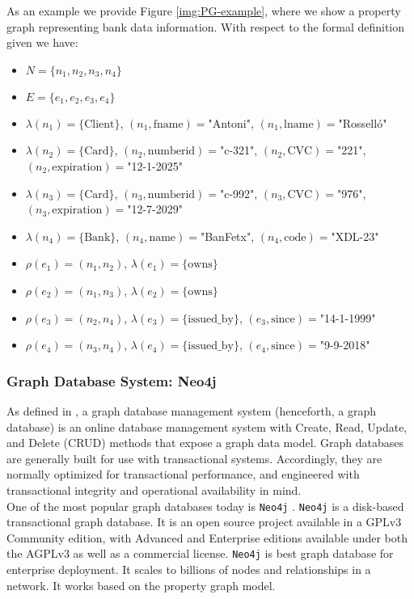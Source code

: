 As an example we provide Figure \ref{img:PG-example}, where we show a property graph representing bank data information. With respect to the formal definition given we have:
\begin{itemize}
    \item $N = \{n_1, n_2, n_3, n_4\}$
    \item $E = \{e_1, e_2, e_3, e_4\}$
    \item $\lambda(n_1)=\{\text{Client}\}$, $(n_1, \text{fname})=$"Antoni", $(n_1, \text{lname})=$"Rosselló"
    \item $\lambda(n_2)=\{\text{Card}\}$, $(n_2, \text{numberid})=$"c-321", $(n_2, \text{CVC})=$"221", $(n_2, \text{expiration})=$"12-1-2025"
    \item $\lambda(n_3)=\{\text{Card}\}$, $(n_3, \text{numberid})=$"c-992", $(n_3, \text{CVC})=$"976", $(n_3, \text{expiration})=$"12-7-2029"
    \item $\lambda(n_4)=\{\text{Bank}\}$, $(n_4, \text{name})=$"BanFetx", $(n_4, \text{code})=$"XDL-23"
    \item $\rho(e_1) = (n_1, n_2)$, $\lambda(e_1)=\{\text{owns}\}$
    \item $\rho(e_2) = (n_1, n_3)$, $\lambda(e_2)=\{\text{owns}\}$
    \item $\rho(e_3) = (n_2, n_4)$, $\lambda(e_3)=\{\text{issued\_by}\}$, $(e_3, \text{since})=$"14-1-1999"
    \item $\rho(e_4) = (n_3, n_4)$, $\lambda(e_4)=\{\text{issued\_by}\}$, $(e_4, \text{since})=$"9-9-2018"
\end{itemize}

\subsubsection*{Graph Database System: Neo4j}\label{prelim:graphdbsystem-neo4j}

As defined in \cite{Graph-Databases-OReally-book}, a graph database management system (henceforth, a graph database) is an online
database management system with Create, Read, Update, and Delete (CRUD) methods that expose a graph data model. Graph databases are generally built for use with
transactional systems. Accordingly, they are normally optimized for transactional performance, and engineered with transactional integrity and operational
availability in mind.\\

One of the most popular graph databases today is \texttt{Neo4j} \cite{GDB-kumar2015graph}. \texttt{Neo4j} is a disk-based transactional graph database. It is an open source project available in a GPLv3 Community edition, with Advanced and Enterprise editions available under both the AGPLv3 as well as a commercial license.  \texttt{Neo4j} is best graph
database for enterprise deployment. It scales to billions of nodes and relationships in a network. It works based on the property graph model.\\

